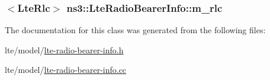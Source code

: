 \subsubsection[{\texorpdfstring{m\+\_\+rlc}{m_rlc}}]{$<${\bf Lte\+Rlc}$>$ ns3\+::\+Lte\+Radio\+Bearer\+Info\+::m\+\_\+rlc}\hypertarget{classns3_1_1LteRadioBearerInfo_a352622b4fc23346ebfbfc72a0c118eab}{}\label{classns3_1_1LteRadioBearerInfo_a352622b4fc23346ebfbfc72a0c118eab}


The documentation for this class was generated from the following files\+:\begin{DoxyCompactItemize}
\item 
lte/model/\hyperlink{lte-radio-bearer-info_8h}{lte-\/radio-\/bearer-\/info.\+h}\item 
lte/model/\hyperlink{lte-radio-bearer-info_8cc}{lte-\/radio-\/bearer-\/info.\+cc}\end{DoxyCompactItemize}
